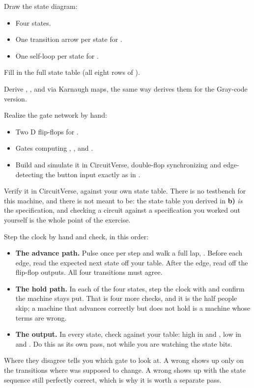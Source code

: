 \begin{parts}
  \item Draw the state diagram:
    \begin{itemize}
      \item Four states.
      \item One transition arrow per state for .
      \item One self-loop per state for .
    \end{itemize}
  \item Fill in the full state table (all eight rows of ).
  \item Derive , , and  via Karnaugh maps, the same way 
    derives them for the Gray-code version.
  \item Realize the gate network by hand:
    \begin{itemize}
      \item Two D flip-flops for .
      \item Gates computing , , and .
      \item Build and simulate it in CircuitVerse, double-flop synchronizing and edge-detecting the
        button input exactly as in .
    \end{itemize}
  \item Verify it in CircuitVerse, against your own state table. There is no testbench for this
    machine, and there is not meant to be: the state table you derived in \textbf{b)} \emph{is} the
    specification, and checking a circuit against a specification you worked out yourself is the
    whole point of the exercise.

    Step the clock by hand and check, in this order:
    \begin{itemize}
      \item \textbf{The advance path.} Pulse  once per step and walk a full lap,
        . Before each edge, read the expected next state off your
        table. After the edge, read  off the flip-flop outputs. All four
        transitions must agree.
      \item \textbf{The hold path.} In each of the four states, step the clock with 
        and confirm the machine stays put. That is four more checks, and it is the half people
        skip; a machine that advances correctly but does not hold is a machine whose 
        terms are wrong.
      \item \textbf{The output.} In every state, check  against your table: high in
         and , low in  and . Do this as its own pass, not
        while you are watching the state bits.
    \end{itemize}
    Where they disagree tells you which gate to look at. A wrong  shows up only on the
    transitions where  was supposed to change. A wrong  shows up with the state
    sequence still perfectly correct, which is why it is worth a separate pass.
\end{parts}
